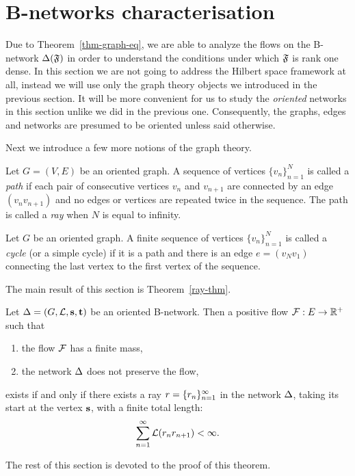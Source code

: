 \documentclass[12pt,oneside,a4paper]{amsart}
\begin{document}
  \bigskip
  \section{B-networks characterisation}
    \label{sec:char}
    Due to Theorem~\ref{thm-graph-eq}, we are able to analyze the flows on the B-network
      $\Delta(\mathfrak{F})$ in order to understand the conditions under which $\mathfrak{F}$ is rank one dense.
    In this section we are not going to address the Hilbert space framework at all,
      instead we will use only the graph theory objects we introduced in the previous section.
    It will be more convenient for us to study the \emph{oriented} networks in this section unlike we
      did in the previous one.
    Consequently, the graphs, edges and networks are presumed to be oriented unless said otherwise.

    Next we introduce a few more notions of the graph theory.
    \begin{definition}
      Let $G = (V, E)$ be an oriented graph.
      A sequence of vertices $\{v_n\}_{n=1}^N$ is called a \emph{path} if each pair of consecutive vertices
        $v_n$ and $v_{n+1}$ are connected by an edge $(v_n v_{n+1})$ and no edges or vertices are repeated twice in the sequence.
      The path is called a \emph{ray} when $N$ is equal to infinity.
    \end{definition}
    \begin{definition}
      Let $G$ be an oriented graph.
      A finite sequence of vertices $\{v_n\}_{n=1}^N$ is called a \emph{cycle} (or a simple cycle) if it is
        a path and there is an edge $e = (v_N v_1)$ connecting the last vertex to the first vertex of the sequence.
    \end{definition}

    The main result of this section is Theorem~\ref{ray-thm}.
    \begin{theorem}
      \label{ray-thm}
      Let $\Delta = (G, \mathcal{L}, \mathbf{s}, \mathbf{t})$ be an oriented B-network.
      Then a positive flow $\mathcal{F}: E \to \mathbb{R}^{+}$ such that
      \begin{enumerate}[label=\textup{(\alph*)}]
        \item the flow $\mathcal{F}$ has a finite mass,
        \item the network $\Delta$ does not preserve the flow,
      \end{enumerate}
      exists if and only if there exists a ray $r = \{{r}_n\}_{n=1}^\infty$ in the network $\Delta$, taking its start at the vertex $\mathbf{s}$,
        with a finite total length:
      \[
        \sum_{n=1}^\infty \mathcal{L}(r_n r_{n+1}) < \infty.
      \]
    \end{theorem}
    The rest of this section is devoted to the proof of this theorem.
\end{document}
